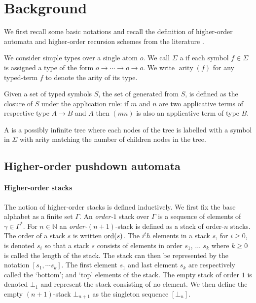 \documentclass[a4paper,draft]{article}[12pt]
\theoremstyle{remark}
\theoremstyle{definition}
\newcommand\arity{\mathop{\mathrm{arity}}}
\begin{document}
\section{Background}
We first recall some basic notations and recall the definition of higher-order automata and higher-order recursion schemes from the literature \cite{KNU02,hague-collaps-full}.

We consider simple types over a single atom $o$. We call $\Sigma$ a  if each symbol $f \in \Sigma$ is assigned a type of the form $o \longrightarrow  \cdots \longrightarrow o \longrightarrow  o$. We write $\arity(f)$ for any typed-term $f$ to denote the arity of its type.

Given a set of typed symbols $S$, the set of  generated from $S$, is defined as the closure of $S$ under the application rule: if $m$ and $n$ are two applicative terms of respective type $A\rightarrow B$ and $A$ then $(m n)$ is also an applicative term of type $B$.

A  is a possibly infinite tree where each nodes of the tree is labelled with a symbol in $\Sigma$ with arity matching the number of children nodes in the tree.


\subsection{Higher-order pushdown automata}
\paragraph{Higher-order stacks}
The notion of higher-order stacks is defined inductively. We first fix the base alphabet as a finite set $\Gamma$. An \emph{order-$1$} stack over $\Gamma$ is a sequence of elements of $\gamma \in \Gamma^*$. For $n \in \mathbb{N}$ an \emph{order-$(n+1)$}-stack is defined as a stack of order-$n$ stacks.
The order of a stack $s$ is written $\mathop{\mathrm{ord}}(s)$. The $i^th$ elements in a stack $s$, for $i\geq 0$, is denoted $s_i$ so that a stack $s$ consists of elements in order $s_1$, $\dots$ $s_k$ where $k\geq0$ is called the length of the stack. The stack can then be represented by the notation $[s_1, \cdots s_k]$. The first element $s_1$ and last element $s_k$ are respectively called the `bottom'; and `top' elements of the stack.
The empty stack of order $1$ is denoted $\bot_1$ and represent the stack consisting of no element. We then define the empty $(n+1)$-stack $\bot_{n+1}$ as the singleton sequence $[ \bot_n ]$.
\end{document}
